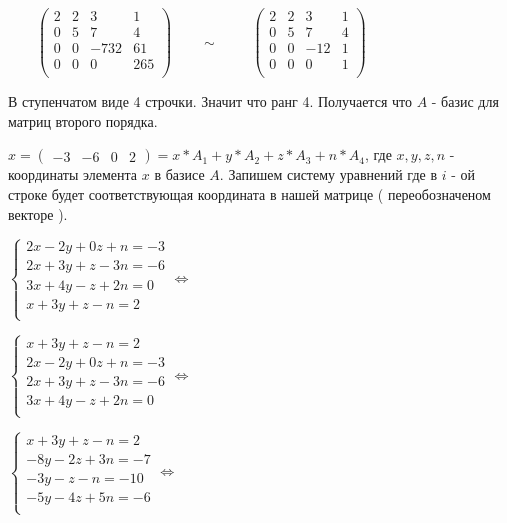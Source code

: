 \begin{enumerate}
	$\qquad\begin{pmatrix}
	2 & 2 & 3 & 1\\
	0 & 5 & 7 & 4\\
	0 & 0 & -732 & 61\\
	0 & 0 & 0 & 265\\
	\end{pmatrix}\qquad \sim $
	$\qquad\begin{pmatrix}
	2 & 2 & 3 & 1\\
	0 & 5 & 7 & 4\\
	0 & 0 & -12 & 1\\
	0 & 0 & 0 & 1\\
	\end{pmatrix}\qquad $

	В ступенчатом виде 4 строчки. Значит что ранг 4. Получается что $A$ - базис для матриц второго порядка.

	$x = \begin{pmatrix}-3 & -6 & 0 & 2\end{pmatrix} = x*A_1 + y*A_2 + z*A_3 + n*A_4$,
	где $x,y,z,n$ - координаты элемента $x$ в базисе $A$. Запишем систему уравнений где в $i$ - ой строке будет соответствующая координата в нашей матрице ( переобозначеном векторе ).

	\begin{multicols}{2}
	$ \begin{cases}
	2x -2y + 0z + n = -3\\
	2x + 3y + z -3n = -6\\
	3x + 4y - z + 2n = 0\\
	x + 3y + z - n = 2\\
	\end{cases} \Longleftrightarrow $

	$ \begin{cases}
	x + 3y + z - n = 2 \\
	2x -2y + 0z + n = -3\\
	2x + 3y + z -3n = -6\\
	3x + 4y - z + 2n = 0\\
	\end{cases} \Longleftrightarrow  $

	$ \begin{cases}
	x + 3y + z - n = 2 \\
	 -8y - 2z + 3n = -7\\
	 -3y -z -n = -10\\
	  -5y - 4z + 5n = -6\\
	\end{cases}  \Longleftrightarrow $


\end{multicols}
\end{enumerate}
